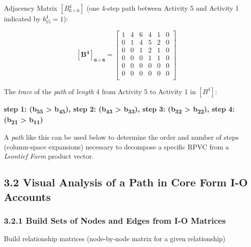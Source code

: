 \documentclass[
  letterpaper,
  DIV=11,
  numbers=noendperiod]{scrreprt}
\begin{document}
Adjacency Matrix \([B^{4}_{6\times 6}]\) (one 4-step path between
Activity 5 and Activity 1 indicated by \(b^{4}_{15}=1\)):

\[\mathbf{[B^{4}]_{6\times 6}} = \left[\begin{array}
{rrr}
1 & 4 & 6 & 4 & 1 & 0 \\
0 & 1 & 4 & 5 & 2 & 0 \\
0 & 0 & 1 & 2 & 1 & 0 \\
0 & 0 & 0 & 1 & 1 & 0 \\
0 & 0 & 0 & 0 & 0 & 0 \\
0 & 0 & 0 & 0 & 0 & 0 \\
\end{array}\right]
\]

The \emph{trace} of the \emph{path} of \emph{length} 4 from Activity 5
to Activity 1 in \([B^{4}]\):

\textbf{step 1: (b\textsubscript{55} \textgreater{}
b\textsubscript{45}), step 2: (b\textsubscript{43} \textgreater{}
b\textsubscript{33}), step 3: (b\textsubscript{32} \textgreater{}
b\textsubscript{22}), step 4: (b\textsubscript{21} \textgreater{}
b\textsubscript{11})}

A \emph{path} like this can be used below to determine the order and
number of steps (column-space expansions) necessary to decompose a
specific RPVC from a \emph{Leontief Form} product vector.

\subsection{3.2 Visual Analysis of a Path in Core Form I-O
Accounts}\label{visual-analysis-of-a-path-in-core-form-i-o-accounts}

\subsubsection{3.2.1 Build Sets of Nodes and Edges from I-O
Matrices}\label{build-sets-of-nodes-and-edges-from-i-o-matrices}

Build relationship matrices (node-by-node matrix for a given
relationship)
\end{document}
